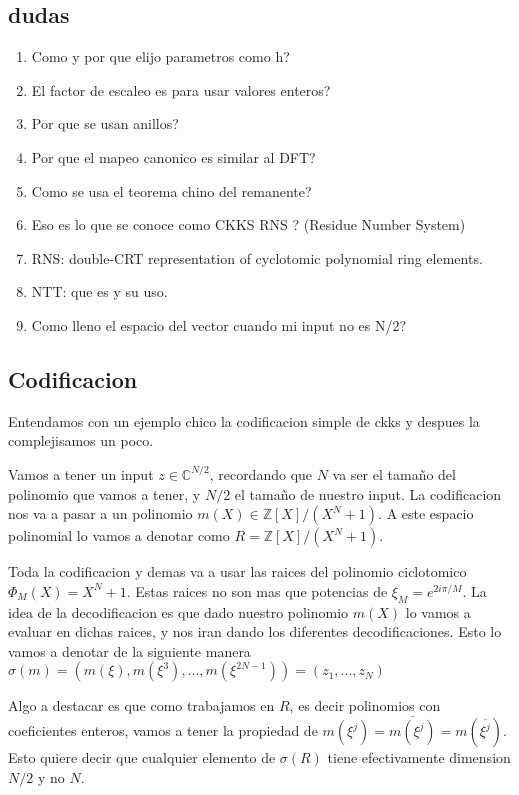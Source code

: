 \documentclass[12pt, oneside]{article}
\begin{document}
\subsection{dudas}
\begin{enumerate}
  \item Como y por que elijo parametros como h?
  \item El factor de escaleo es para usar valores enteros?
  \item Por que se usan anillos?
  \item Por que el mapeo canonico es similar al DFT?
  \item Como se usa el teorema chino del remanente?
  \item Eso es lo que se conoce como CKKS RNS ? (Residue Number System)
  \item RNS: double-CRT representation of cyclotomic polynomial ring elements.
  \item NTT: que es y su uso.
  \item Como lleno el espacio del vector cuando mi input no es N/2?
\end{enumerate}

\subsection{Codificacion}

Entendamos con un ejemplo chico la codificacion simple de ckks y despues la
complejisamos un poco.

Vamos a tener un input $z\in \mathbb{C}^{N/2}$, recordando que $N$ va ser el tamaño
del polinomio que vamos a tener, y $N/2$ el tamaño de nuestro input.
La codificacion nos va a pasar a un polinomio $m(X)\in \mathbb{Z}[X]/(X^N+1)$.
A este espacio polinomial lo vamos a denotar como $R= \mathbb{Z}[X]/(X^N+1)$.

Toda la codificacion y demas va a usar las raices del polinomio ciclotomico $\Phi_M(X)=
X^N+1$.
Estas raices no son mas que potencias de $\xi_M=e^{2i\pi/M}$.
La idea de la decodificacion es que dado nuestro polinomio $m(X)$ lo vamos a evaluar en dichas
raices, y nos iran dando los diferentes decodificaciones.
Esto lo vamos a denotar de la siguiente manera $\sigma(m) = (m(\xi), m(\xi^3),...,m(\xi^{2N-1}))=(z_1,...,z_N)$

Algo a destacar es que como trabajamos en  $R$, es decir polinomios con coeficientes enteros,
vamos a tener la propiedad de $m(\xi^j)=\overline{m(\xi^j)}=m(\overline{\xi^j})$.
Esto quiere decir que cualquier elemento de $\sigma(R)$ tiene efectivamente dimension
$N/2$ y no $N$.
\end{document}
